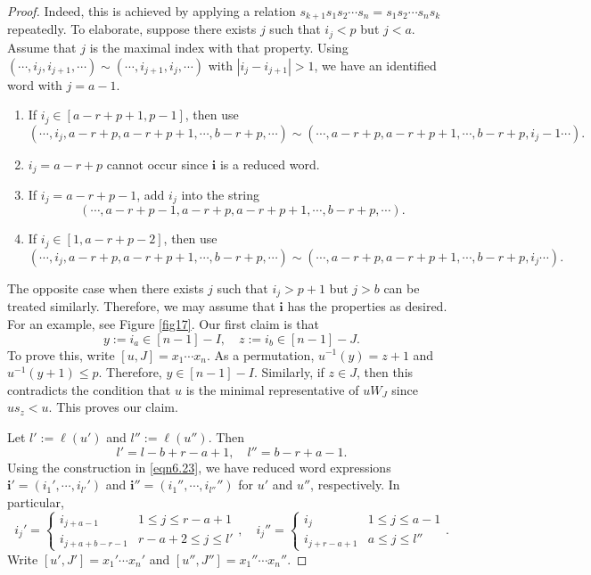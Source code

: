 \documentclass[12pt]{amsart}
\theoremstyle{definition}
\theoremstyle{remark}
\begin{document}
\begin{proof}
Indeed, this is achieved by applying a relation $s_{k+1} s_1 s_2 \cdots s_n = s_1 s_2 \cdots s_n s_{k}$ repeatedly. To elaborate, suppose there exists $j$ such that $i_j < p$ but $j <a$. Assume that $j$ is the maximal index with that property. Using $(\cdots , i_j , i_{j+1} , \cdots) \sim (\cdots , i_{j+1} , i_j, \cdots)$ with $|i_j - i_{j+1}|>1$, we have an identified word with $j = a-1$.
\begin{enumerate}
\item If $i_j \in [a-r+p+1 ,  p-1]$, then use
\begin{equation*}
(\cdots , i_j , a-r+p , a-r+p+1 , \cdots , b-r+p, \cdots ) \sim (\cdots , a-r+p , a-r+p+1 , \cdots ,  b-r+p, i_j - 1\cdots ).
\end{equation*}
\item $i_j = a-r+p$ cannot occur since $\mathbf{i}$ is a reduced word.
\item If $i_j = a-r+p-1$, add $i_j$ into the string
\begin{equation*}
(\cdots , a-r+p-1, a-r+p , a-r+p+1 , \cdots ,b-r+p, \cdots).
\end{equation*}
\item If $i_j \in [1 , a-r+p-2]$, then use
\begin{equation*}
(\cdots , i_j , a-r+p , a-r+p+1 , \cdots , b-r+p, \cdots ) \sim (\cdots , a-r+p , a-r+p+1 , \cdots , b-r+p, i_j \cdots ).
\end{equation*}
\end{enumerate}
The opposite case when there exists $j$ such that $i_j > p+1$ but $j >b$ can be treated similarly. Therefore, we may assume that $\mathbf{i}$ has the properties as desired. For an example, see Figure \ref{fig17}. Our first claim is that
\begin{equation}\label{eqn6.14}
y:=i_a \in [n-1]-I , \quad z:=i_b \in [n-1]-J.
\end{equation}
To prove this, write $[u,J] = x_1 \cdots x_n$. As a permutation, $u^{-1}(y)=z+1$ and $u^{-1}(y+1) \leq p$. Therefore, $y \in [n-1]-I$. Similarly, if $z \in J$, then this contradicts the condition that $u$ is the minimal representative of $uW_J$ since $us_z < u$. This proves our claim.

Let $l':=\ell (u')$ and $l'':=\ell (u'')$. Then
\begin{equation}
l'=l-b+r-a+1, \quad l''=b-r+a-1.
\end{equation}
Using the construction in \eqref{eqn6.23}, we have reduced word expressions $\mathbf{i'} = (i_1' , \cdots, i_{l'}')$ and $\mathbf{i''} = (i_1'' , \cdots, i_{l''}'')$ for $u'$ and $u''$, respectively. In particular,
\begin{equation}\label{eqn6.24}
i_j ' =
\begin{cases}
i_{j+a-1} & 1 \leq j \leq r-a+1 \\
i_{j+a+b-r-1} & r-a+2 \leq j \leq l'
\end{cases}
, \quad i_j''=
\begin{cases}
i_j & 1 \leq j \leq a-1 \\
i_{j+r-a+1} & a \leq j \leq l''
\end{cases}
.
\end{equation}
Write $[u' , J'] = x_1 '  \cdots x_n' $ and $[u'', J''] = x_1 '' \cdots x_n ''$.


\end{proof}
\end{document}
